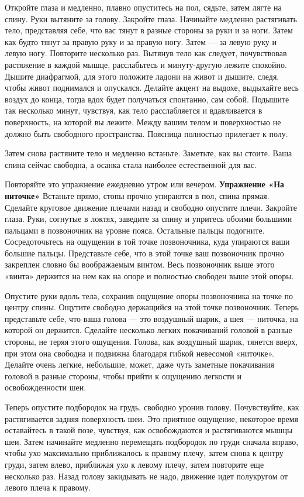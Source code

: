 Откройте глаза и медленно, плавно опуститесь на пол, сядьте, затем лягте на спину. Руки вытяните за голову. Закройте глаза. Начинайте медленно растягивать тело, представляя себе, что вас тянут в разные стороны за руки и за ноги. Затем как будто тянут за правую руку и за правую ногу. Затем --- за левую руку и левую ногу. Повторите несколько раз. Вытянув тело как следует, почувствовав растяжение в каждой мышце, расслабьтесь и минуту-другую лежите спокойно. Дышите диафрагмой, для этого положите ладони на живот и дышите, следя, чтобы живот поднимался и опускался. Делайте акцент на выдохе, выдыхайте весь воздух до конца, тогда вдох будет получаться спонтанно, сам собой. Подышите так несколько минут, чувствуя, как тело расслабляется
и вдавливается в поверхность, на которой вы лежите.
Между вашим телом и поверхностью не должно быть свободного пространства. Поясница полностью прилегает к полу.

Затем снова растяните тело и медленно встаньте. Заметьте, как вы стоите. Ваша спина сейчас свободна, а осанка стала наиболее естественной для вас.

Повторяйте это упражнение ежедневно утром или вечером.
\bigskip
{\bf Упражнение «На ниточке»}
\medskip
Встаньте прямо, стопы прочно упираются в пол, спина прямая. Сделайте круговое движение плечами
назад и свободно опустите плечи. Закройте глаза. Руки, согнутые в локтях, заведите за спину и
упритесь обоими большими пальцами в позвоночник на уровне пояса. Остальные пальцы подогните.
Сосредоточьтесь на ощущении в той точке позвоночника, куда упираются ваши большие пальцы.
Представьте себе, что в этой точке ваш позвоночник прочно закреплен словно бы воображаемым винтом. Весь позвоночник выше этого «винта» держится на нем как на опоре и полностью свободен выше этой опоры.

Опустите руки вдоль тела, сохранив ощущение опоры позвоночника на точке по центру спины. Ощутите
свободно держащийся на этой точке позвоночник. Теперь представьте себе, что ваша голова --- это
воздушный шарик, а шея --- ниточка, на которой он держится. Сделайте несколько легких покачиваний
головой в разные стороны, не теряя этого ощущения. Голова, как воздушный шарик, тянется вверх, при этом она свободна и подвижна благодаря гибкой невесомой «ниточке». Делайте очень легкие, небольшие,
может, даже чуть заметные покачивания головой в разные стороны, чтобы прийти к ощущению легкости и освобожденности шеи.

Теперь опустите подбородок на грудь, свободно уронив голову. Почувствуйте, как растягивается задняя поверхность шеи. Это приятное ощущение, некоторое время оставайтесь в такой позе, чувствуя, как освобождаются и растягиваются мышцы шеи. Затем начинайте медленно перемещать подбородок по груди сначала вправо, чтобы ухо максимально приближалось к правому плечу, затем снова к центру груди, затем влево, приближая ухо к левому плечу, затем повторите еще несколько раз. Назад голову закидывать не надо, движение идет полукругом от левого плеча к правому.

